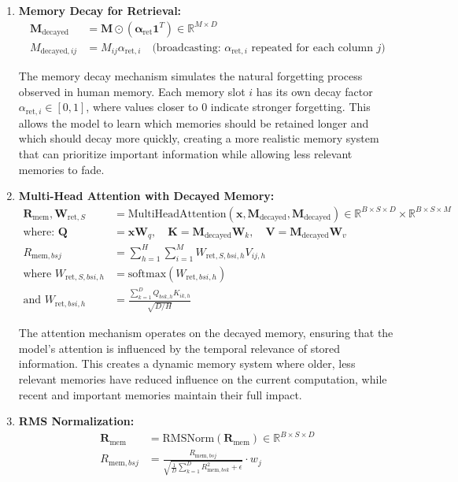 \documentclass{article}
\begin{document}
\begin{enumerate}
\item \textbf{Memory Decay for Retrieval:}
\begin{align}
\mathbf{M}_{\text{decayed}} &= \mathbf{M} \odot (\boldsymbol{\alpha}_{\text{ret}} \mathbf{1}^T) \in \mathbb{R}^{M \times D} \\
M_{\text{decayed},ij} &= M_{ij} \alpha_{\text{ret},i} \quad \text{(broadcasting: $\alpha_{\text{ret},i}$ repeated for each column $j$)}
\end{align}

The memory decay mechanism simulates the natural forgetting process observed in human memory. Each memory slot $i$ has its own decay factor $\alpha_{\text{ret},i} \in [0,1]$, where values closer to 0 indicate stronger forgetting. This allows the model to learn which memories should be retained longer and which should decay more quickly, creating a more realistic memory system that can prioritize important information while allowing less relevant memories to fade.

\item \textbf{Multi-Head Attention with Decayed Memory:}
\begin{align}
\mathbf{R}_{\text{mem}}, \mathbf{W}_{\text{ret},S} &= \text{MultiHeadAttention}(\mathbf{x}, \mathbf{M}_{\text{decayed}}, \mathbf{M}_{\text{decayed}}) \in \mathbb{R}^{B \times S \times D} \times \mathbb{R}^{B \times S \times M} \\
\text{where: } \mathbf{Q} &= \mathbf{x} \mathbf{W}_q, \quad \mathbf{K} = \mathbf{M}_{\text{decayed}} \mathbf{W}_k, \quad \mathbf{V} = \mathbf{M}_{\text{decayed}} \mathbf{W}_v \\
R_{\text{mem},bsj} &= \sum_{h=1}^{H} \sum_{i=1}^{M} W_{\text{ret},S,bsi,h} V_{ij,h} \\
\text{where } W_{\text{ret},S,bsi,h} &= \text{softmax}(W_{\text{ret},bsi,h}) \\
\text{and } W_{\text{ret},bsi,h} &= \frac{\sum_{k=1}^{D} Q_{bsk,h} K_{ik,h}}{\sqrt{D/H}}
\end{align}

The attention mechanism operates on the decayed memory, ensuring that the model's attention is influenced by the temporal relevance of stored information. This creates a dynamic memory system where older, less relevant memories have reduced influence on the current computation, while recent and important memories maintain their full impact.

\item \textbf{RMS Normalization:}
\begin{align}
\mathbf{R}_{\text{mem}} &= \text{RMSNorm}(\mathbf{R}_{\text{mem}}) \in \mathbb{R}^{B \times S \times D} \\
R_{\text{mem},bsj} &= \frac{R_{\text{mem},bsj}}{\sqrt{\frac{1}{D}\sum_{k=1}^{D} R_{\text{mem},bsk}^2 + \epsilon}} \cdot w_j
\end{align}


\end{enumerate}
\end{document}
